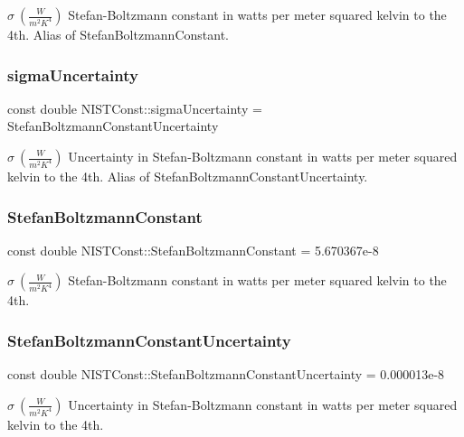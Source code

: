 $\sigma \ (\frac{W}{m^2 K^4})$ Stefan-\/\+Boltzmann constant in watts per meter squared kelvin to the 4th. Alias of Stefan\+Boltzmann\+Constant. \mbox{\label{group___n_i_s_t_const-_stefan_boltzmann_constant_ga0b88b9501b1c17b97f06de9ab7ba71f2}} 
\subsubsection{\texorpdfstring{sigma\+Uncertainty}{sigmaUncertainty}}
{\footnotesize\ttfamily const double N\+I\+S\+T\+Const\+::sigma\+Uncertainty = Stefan\+Boltzmann\+Constant\+Uncertainty}

$\sigma \ (\frac{W}{m^2 K^4})$ Uncertainty in Stefan-\/\+Boltzmann constant in watts per meter squared kelvin to the 4th. Alias of Stefan\+Boltzmann\+Constant\+Uncertainty. \mbox{\label{group___n_i_s_t_const-_stefan_boltzmann_constant_ga1094e420290686333202d186399d706d}} 
\subsubsection{\texorpdfstring{Stefan\+Boltzmann\+Constant}{StefanBoltzmannConstant}}
{\footnotesize\ttfamily const double N\+I\+S\+T\+Const\+::\+Stefan\+Boltzmann\+Constant = 5.\+670367e-\/8}

$\sigma \ (\frac{W}{m^2 K^4})$ Stefan-\/\+Boltzmann constant in watts per meter squared kelvin to the 4th. \mbox{\label{group___n_i_s_t_const-_stefan_boltzmann_constant_ga98b40b4f7ea1cd358d0a140bf8f6973c}} 
\subsubsection{\texorpdfstring{Stefan\+Boltzmann\+Constant\+Uncertainty}{StefanBoltzmannConstantUncertainty}}
{\footnotesize\ttfamily const double N\+I\+S\+T\+Const\+::\+Stefan\+Boltzmann\+Constant\+Uncertainty = 0.\+000013e-\/8}

$\sigma \ (\frac{W}{m^2 K^4})$ Uncertainty in Stefan-\/\+Boltzmann constant in watts per meter squared kelvin to the 4th. 